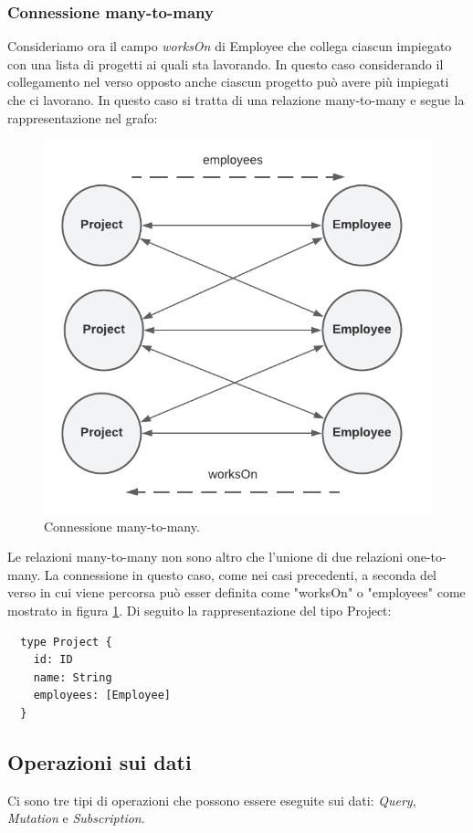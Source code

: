 \subsubsection*{Connessione many-to-many}
Consideriamo ora il campo \textit{worksOn} di Employee che collega ciascun impiegato con una lista di progetti ai quali sta lavorando. In questo caso considerando il collegamento nel verso opposto anche ciascun progetto può avere più impiegati che ci lavorano. In questo caso si tratta di una relazione many-to-many e segue la rappresentazione nel grafo:
\begin{figure}[!h]
\centering
\includegraphics[width=0.4\linewidth]{immagini/many_to_many.pdf}
\caption{Connessione many-to-many.}
\label{many-to-many}
\end{figure}
Le relazioni many-to-many non sono altro che l'unione di due relazioni one-to-many.
La connessione in questo caso, come nei casi precedenti, a seconda del verso in cui viene percorsa può esser definita come "worksOn" o "employees" come mostrato in figura \ref{many-to-many}. Di seguito la rappresentazione del tipo Project:
\begin{verbatim}
  type Project {
    id: ID
    name: String
    employees: [Employee]
  }
\end{verbatim}
\subsection*{Operazioni sui dati}
Ci sono tre tipi di operazioni che possono essere eseguite sui dati: \textit{Query}, \textit{Mutation} e \textit{Subscription}.
